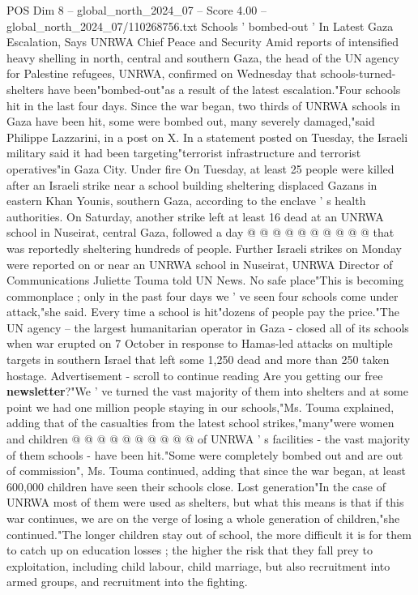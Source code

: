\begin{textsample}{POS Dim 8 – global\_north\_2024\_07 – Score 4.00 – global\_north\_2024\_07/110268756.txt}  \label{ex:f8_pos_270}
Schools ' bombed-out ' In Latest Gaza Escalation, Says UNRWA Chief Peace and Security Amid reports of intensified heavy shelling in north, central and southern Gaza, the head of the UN agency for Palestine refugees, UNRWA, confirmed on Wednesday that schools-turned-shelters have been"bombed-out"as a result of the latest escalation."Four schools hit in the last four days.
Since the war began, two thirds of UNRWA schools in Gaza have been hit, some were bombed out, many severely damaged,"said Philippe Lazzarini, in a post on X.
In a statement posted on Tuesday, the Israeli military said it had been targeting"terrorist infrastructure and terrorist operatives"in Gaza City.
Under fire On Tuesday, at least 25 people were killed after an Israeli strike near a school building sheltering displaced Gazans in eastern Khan Younis, southern Gaza, according to the enclave ' s health authorities.
On Saturday, another strike left at least 16 dead at an UNRWA school in Nuseirat, central Gaza, followed a day @ @ @ @ @ @ @ @ @ @ that was reportedly sheltering hundreds of people.
Further Israeli strikes on Monday were reported on or near an UNRWA school in Nuseirat, UNRWA Director of Communications Juliette Touma told UN News.
No safe place"This is becoming commonplace ; only in the past four days we ' ve seen four schools come under attack,"she said.
Every time a school is hit"dozens of people pay the price."The UN agency -- the largest humanitarian operator in Gaza - closed all of its schools when war erupted on 7 October in response to Hamas-led attacks on multiple targets in southern Israel that left some 1,250 dead and more than 250 taken hostage.
Advertisement - scroll to continue reading Are you getting our free \textbf{newsletter}?"We ' ve turned the vast majority of them into shelters and at some point we had one million people staying in our schools,"Ms.
Touma explained, adding that of the casualties from the latest school strikes,"many"were women and children @ @ @ @ @ @ @ @ @ @ of UNRWA ' s facilities - the vast majority of them schools - have been hit."Some were completely bombed out and are out of commission", Ms.
Touma continued, adding that since the war began, at least 600,000 children have seen their schools close.
Lost generation"In the case of UNRWA most of them were used as shelters, but what this means is that if this war continues, we are on the verge of losing a whole generation of children,"she continued."The longer children stay out of school, the more difficult it is for them to catch up on education losses ; the higher the risk that they fall prey to exploitation, including child labour, child marriage, but also recruitment into armed groups, and recruitment into the fighting.

\end{textsample}
